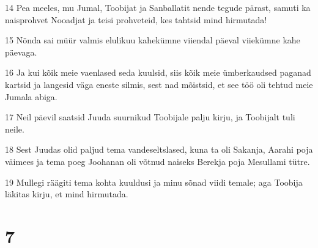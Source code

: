 \par 14 Pea meeles, mu Jumal, Toobijat ja Sanballatit nende tegude pärast, samuti ka naisprohvet Nooadjat ja teisi prohveteid, kes tahtsid mind hirmutada!
\par 15 Nõnda sai müür valmis elulikuu kahekümne viiendal päeval viiekümne kahe päevaga.
\par 16 Ja kui kõik meie vaenlased seda kuulsid, siis kõik meie ümberkaudsed paganad kartsid ja langesid väga eneste silmis, sest nad mõistsid, et see töö oli tehtud meie Jumala abiga.
\par 17 Neil päevil saatsid Juuda suurnikud Toobijale palju kirju, ja Toobijalt tuli neile.
\par 18 Sest Juudas olid paljud tema vandeseltslased, kuna ta oli Sakanja, Aarahi poja väimees ja tema poeg Joohanan oli võtnud naiseks Berekja poja Mesullami tütre.
\par 19 Mullegi räägiti tema kohta kuuldusi ja minu sõnad viidi temale; aga Toobija läkitas kirju, et mind hirmutada.

\chapter{7}

